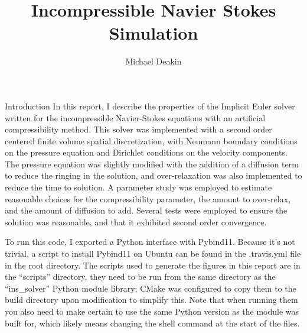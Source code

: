 \documentclass{article}
\title{Incompressible Navier Stokes Simulation}
\author{Michael Deakin}
\begin{document}
\maketitle

\begin{section}{Introduction}
In this report, I describe the properties of the Implicit Euler solver written for the incompressible Navier-Stokes equations with an artificial compressibility method.
This solver was implemented with a second order centered finite volume spatial discretization,
with Neumann boundary conditions on the pressure equation and Dirichlet conditions on the velocity components.
The pressure equation was slightly modified with the addition of a diffusion term to reduce the ringing in the solution,
and over-relaxation was also implemented to reduce the time to solution.
A parameter study was employed to estimate reasonable choices for the compressibility parameter,
the amount to over-relax, and the amount of diffusion to add.
Several tests were employed to ensure the solution was reasonable,
and that it exhibited second order convergence.

To run this code, I exported a Python interface with Pybind11.
Because it's not trivial, a script to install Pybind11 on Ubuntu can be found in the
.travis.yml file in the root directory.
The scripts used to generate the figures in this report are in the ``scripts'' directory,
they need to be run from the same directory as the ``ins_solver'' Python module library;
CMake was configured to copy them to the build directory upon modification to simplify this.
Note that when running them you also need to make certain to use the same Python version
as the module was built for, which likely means changing the shell command at the start of the files.
\end{section}
\end{document}
